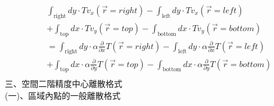 \documentclass[12pt]{article}
\begin{document}
\begin{equation}
  \begin{split}
      &\int_{\mbox{right}} dy \cdot T v_x(\vec{r} = right) - \int_{\mbox{left}} dy \cdot T v_x(\vec{r} = left) \\
      &+ \int_{\mbox{top}} dx \cdot T v_y(\vec{r} = top) - \int_{\mbox{bottom}} dx \cdot T v_y(\vec{r} = bottom) \\
      &=  \int_{\mbox{right}} dy  \cdot  \alpha \frac{\partial }{\partial x }  T(\vec{r} = right) - \int_{\mbox{left}} dy  \cdot  \alpha \frac{\partial }{\partial x }  T(\vec{r} = left) \\
      &+ \int_{\mbox{top}} dx  \cdot  \alpha \frac{\partial }{\partial y }  T(\vec{r} = top) - \int_{\mbox{bottom}} dx  \cdot  \alpha \frac{\partial }{\partial y }  T(\vec{r} = bottom) \\
  \end{split}
\end{equation}
\newpage
\noindent 三、空間二階精度中心離散格式\\

\noindent (一)、區域內點的一般離散格式\\
\end{document}
